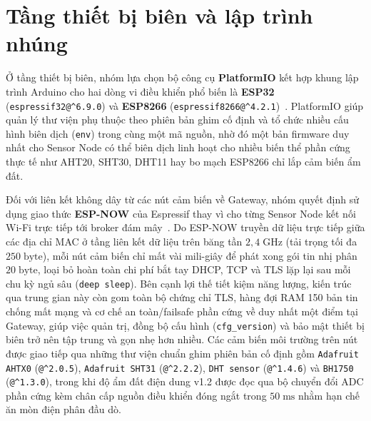 \section{Tầng thiết bị biên và lập trình nhúng}
\label{sec:c2-edge}

Ở tầng thiết bị biên, nhóm lựa chọn bộ công cụ \textbf{PlatformIO} kết hợp khung lập trình Arduino cho hai dòng vi điều khiển phổ biến là \textbf{ESP32} (\texttt{espressif32@\textasciicircum 6.9.0}) và \textbf{ESP8266} (\texttt{espressif8266@\textasciicircum 4.2.1})~\cite{platformioDocs}. PlatformIO giúp quản lý thư viện phụ thuộc theo phiên bản ghim cố định và tổ chức nhiều cấu hình biên dịch (\texttt{env}) trong cùng một mã nguồn, nhờ đó một bản firmware duy nhất cho Sensor Node có thể biên dịch linh hoạt cho nhiều biến thể phần cứng thực tế như AHT20, SHT30, DHT11 hay bo mạch ESP8266 chỉ lắp cảm biến ẩm đất.

Đối với liên kết không dây từ các nút cảm biến về Gateway, nhóm quyết định sử dụng giao thức \textbf{ESP-NOW} của Espressif thay vì cho từng Sensor Node kết nối Wi-Fi trực tiếp tới broker đám mây~\cite{espressifEspNowDocs}. Do ESP-NOW truyền dữ liệu trực tiếp giữa các địa chỉ MAC ở tầng liên kết dữ liệu trên băng tần \(2{,}4\;\text{GHz}\) (tải trọng tối đa \(250\;\text{byte}\)), mỗi nút cảm biến chỉ mất vài mili-giây để phát xong gói tin nhị phân \(20\;\text{byte}\), loại bỏ hoàn toàn chi phí bắt tay DHCP, TCP và TLS lặp lại sau mỗi chu kỳ ngủ sâu (\texttt{deep sleep}). Bên cạnh lợi thế tiết kiệm năng lượng, kiến trúc qua trung gian này còn gom toàn bộ chứng chỉ TLS, hàng đợi RAM 150 bản tin chống mất mạng và cơ chế an toàn/failsafe phần cứng về duy nhất một điểm tại Gateway, giúp việc quản trị, đồng bộ cấu hình (\texttt{cfg\_version}) và bảo mật thiết bị biên trở nên tập trung và gọn nhẹ hơn nhiều. Các cảm biến môi trường trên nút được giao tiếp qua những thư viện chuẩn ghim phiên bản cố định gồm \texttt{Adafruit AHTX0} (\texttt{@\textasciicircum 2.0.5}), \texttt{Adafruit SHT31} (\texttt{@\textasciicircum 2.2.2}), \texttt{DHT sensor} (\texttt{@\textasciicircum 1.4.6}) và \texttt{BH1750} (\texttt{@\textasciicircum 1.3.0}), trong khi độ ẩm đất điện dung v1.2 được đọc qua bộ chuyển đổi ADC phần cứng kèm chân cấp nguồn điều khiển đóng ngắt trong \(50\;\text{ms}\) nhằm hạn chế ăn mòn điện phân đầu dò.

